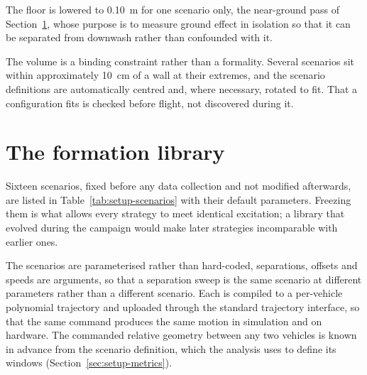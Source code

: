 The floor is lowered to \SI{0.10}{\metre} for one scenario only, the near-ground pass of
Section~\ref{sec:setup-scenarios}, whose purpose is to measure ground effect in isolation so that
it can be separated from downwash rather than confounded with it.

The volume is a binding constraint rather than a formality. Several scenarios sit within
approximately \SI{10}{\centi\metre} of a wall at their extremes, and the scenario definitions are
automatically centred and, where necessary, rotated to fit. That a configuration fits is checked
before flight, not discovered during it.


\section{The formation library}
\label{sec:setup-scenarios}

Sixteen scenarios, fixed before any data collection and not modified afterwards, are listed in
Table~\ref{tab:setup-scenarios} with their default parameters. Freezing them is
what allows every strategy to meet identical excitation; a library that evolved during the campaign
would make later strategies incomparable with earlier ones.

The scenarios are parameterised rather than hard-coded, separations, offsets and speeds are
arguments, so that a separation sweep is the same scenario at different parameters rather than
a different scenario. Each is compiled to a per-vehicle polynomial trajectory and uploaded through
the standard trajectory interface, so that the same command produces the same motion in simulation
and on hardware. The commanded relative geometry between any two vehicles is known in advance from
the scenario definition, which the analysis uses to define its windows
(Section~\ref{sec:setup-metrics}).

